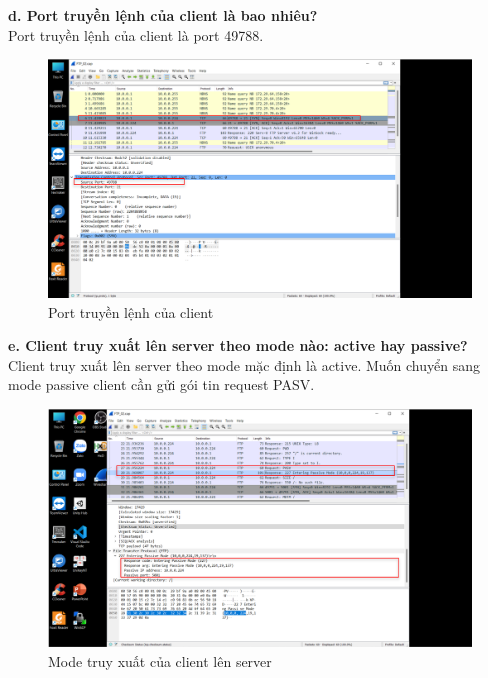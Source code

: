\textbf{d.	Port truyền lệnh của client là bao nhiêu?}\\
Port truyền lệnh của client là port 49788.
\begin{figure}[H]
\begin{center}
\includegraphics[scale=.8]{../figures/p5/p5_2}
\end{center}
\caption{Port truyền lệnh của client}
\end{figure}

\textbf{e.	Client truy xuất lên server theo mode nào: active hay passive?}\\
Client truy xuất lên server theo mode mặc định là active.
Muốn chuyển sang mode passive client cần gửi gói tin request PASV.
\begin{figure}[H]
\begin{center}
\includegraphics[scale=.8]{../figures/p5/p5_3}
\end{center}
\caption{Mode truy xuất của client lên server}
\end{figure}

